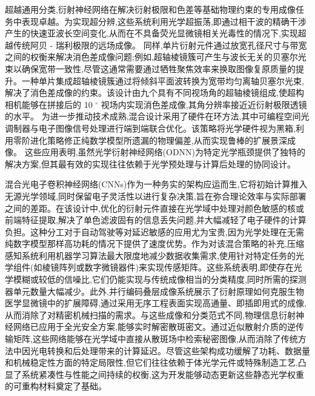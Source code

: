 \documentclass[11pt]{article}
\begin{document}
超越通用分类,衍射神经网络在解决衍射极限和色差等基础物理约束的专用成像任务中表现卓越。为实现超分辨,这些系统利用光学超振荡,即通过相干波的精确干涉产生的快速亚波长空间变化,从而在不具备荧光显微镜相关光毒性的情况下,实现超越传统阿贝 - 瑞利极限的远场成像。\citep{doi_10_1117_12_2576293_e7634e1d} \citep{doi_10_1109_cleo_europe_eqec57999_2023_10231830_c702ffd4} 同样,单片衍射元件通过放宽孔径尺寸与带宽之间的权衡来解决消色差成像问题;例如,超轴棱镜簇可产生与波长无关的贝塞尔光束以确保宽带一致性,尽管这通常需要通过牺牲聚焦效率来换取图像复原质量的提升。一种单片集成超轴棱镜簇通过将倾斜平面波转换为宽带均匀离轴贝塞尔光束,解决了消色差成像的约束。该设计由九个具有不同视场角的超轴棱镜组成,使超构相机能够在拼接后的 10 \(^\circ\) 视场内实现消色差成像,其角分辨率接近近衍射极限透镜的水平。\citep{doi_10_1038_s41377_026_02272_y_42e58df2} 为进一步推动技术成熟,混合设计采用了硬件在环方法,其中可编程空间光调制器与电子图像信号处理进行端到端联合优化。该策略将光学硬件视为黑箱,利用零阶进化策略修正纯数学模型所遗漏的物理偏差,从而实现鲁棒的扩展景深成像。\citep{doi_10_1364_oe_461549_b2d41b3f} 这些应用表明,虽然光学衍射神经网络(ODNN)为特定光学瓶颈提供了独特的解决方案,但其最有效的实现往往依赖于光学预处理与计算后处理的协同设计。\citep{doi_10_1117_1_ap_6_5_056004_3f240d06} \citep{doi_10_1038_s41377_026_02272_y_42e58df2} \citep{doi_10_1364_oe_461549_b2d41b3f}

混合光电子卷积神经网络(CNNs)作为一种务实的架构应运而生,它将初始计算推入无源光学领域,同时保留电子灵活性以进行复杂决策,旨在弥合理论效率与实际部署之间的差距。在该设计中,优化的衍射元件直接在光学域中处理对颜色敏感的核或前端特征提取,解决了单色滤波固有的信息丢失问题,并大幅减轻了电子硬件的计算负担。这种分工对于自动驾驶等对延迟敏感的应用尤为宝贵,因为光学处理在无需纯数字模型那样高功耗的情况下提供了速度优势。作为对该混合策略的补充,压缩感知系统利用机器学习算法最大限度地减少数据收集需求,使用针对特定任务的光学组件(如棱镜阵列或数字微镜器件)来实现传感矩阵。这些系统表明,即使存在光学模糊或较低的信噪比,它们仍能实现与传统成像相当的分类精度,同时所需的探测器单元数量大幅减少。此外,并行编码叠层成像系统展示了衍射原理如何克服生物医学显微镜中的扩展障碍,通过采用无序工程表面实现高通量、即插即用式的成像,从而消除了对精密机械扫描的需求。与这些成像和分类范式不同,物理信息衍射神经网络已应用于全光安全方案,能够实时解密散斑密文。通过近似散射介质的逆传输矩阵,这些网络能够在光学域中直接从散斑场中检索秘密图像,从而消除了传统方法中因光电转换和后处理带来的计算延迟。尽管这些架构成功缓解了功耗、数据量和机械稳定性方面的特定局限性,但它们往往依赖于体光学元件或特殊制造工艺,凸显了系统紧凑性与性能之间持续的权衡,这为开发能够动态更新这些静态光学权重的可重构材料奠定了基础。\citep{doi_10_1038_s41598_018_30619_y_5f5bfb09} \citep{doi_10_1117_1_oe_59_5_051404_363a991a} \citep{doi_10_1021_acsphotonics_1c01085_479fdea3} \citep{doi_10_1117_1_apn_5_1_016010_3e30c230}
\end{document}
